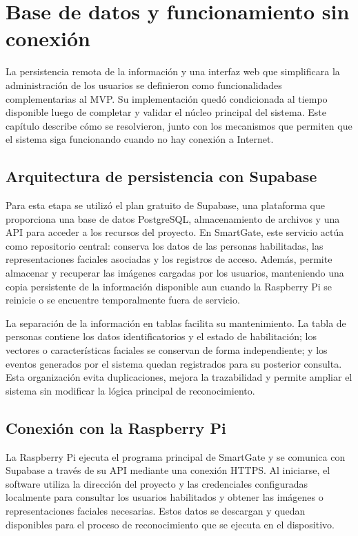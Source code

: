 \chapter{Base de datos y funcionamiento sin conexión}
\label{cap:datos}

La persistencia remota de la información y una interfaz web que simplificara la administración de los usuarios se definieron como funcionalidades complementarias al MVP. Su implementación quedó condicionada al tiempo disponible luego de completar y validar el núcleo principal del sistema. Este capítulo describe cómo se resolvieron, junto con los mecanismos que permiten que el sistema siga funcionando cuando no hay conexión a Internet.

\section{Arquitectura de persistencia con Supabase}

Para esta etapa se utilizó el plan gratuito de Supabase, una plataforma que proporciona una base de datos PostgreSQL, almacenamiento de archivos y una API para acceder a los recursos del proyecto. En SmartGate, este servicio actúa como repositorio central: conserva los datos de las personas habilitadas, las representaciones faciales asociadas y los registros de acceso. Además, permite almacenar y recuperar las imágenes cargadas por los usuarios, manteniendo una copia persistente de la información disponible aun cuando la Raspberry Pi se reinicie o se encuentre temporalmente fuera de servicio.

La separación de la información en tablas facilita su mantenimiento. La tabla de personas contiene los datos identificatorios y el estado de habilitación; los vectores o características faciales se conservan de forma independiente; y los eventos generados por el sistema quedan registrados para su posterior consulta. Esta organización evita duplicaciones, mejora la trazabilidad y permite ampliar el sistema sin modificar la lógica principal de reconocimiento.

\section{Conexión con la Raspberry Pi}

La Raspberry Pi ejecuta el programa principal de SmartGate y se comunica con Supabase a través de su API mediante una conexión HTTPS. Al iniciarse, el software utiliza la dirección del proyecto y las credenciales configuradas localmente para consultar los usuarios habilitados y obtener las imágenes o representaciones faciales necesarias. Estos datos se descargan y quedan disponibles para el proceso de reconocimiento que se ejecuta en el dispositivo.

